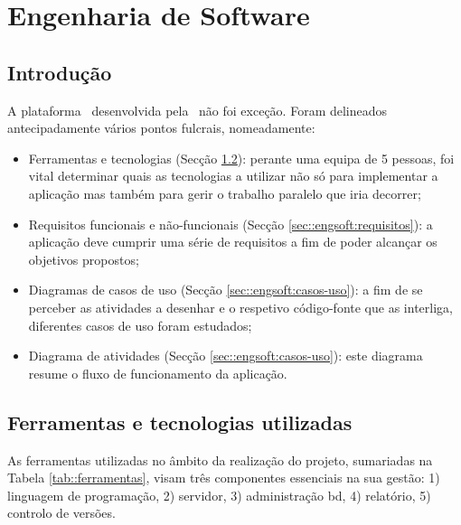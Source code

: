 \chapter{Engenharia de Software}
\label{ch::engsoft}


\section{Introdução}
\label{sec::engsoft:intro}

A plataforma \appname~desenvolvida pela \groupname~não foi exceção. Foram delineados antecipadamente vários pontos fulcrais, nomeadamente:


\begin{itemize}
    \item Ferramentas e tecnologias (Secção \ref{sec::engsoft:tecnologia}): perante uma equipa de 5 pessoas, foi vital determinar quais as tecnologias a utilizar não só para implementar a aplicação mas também para gerir o trabalho paralelo que iria decorrer;
    \item Requisitos funcionais e não-funcionais (Secção \ref{sec::engsoft:requisitos}): a aplicação deve cumprir uma série de requisitos a fim de poder alcançar os objetivos propostos;
    \item Diagramas de casos de uso (Secção \ref{sec::engsoft:casos-uso}): a fim de se perceber as atividades a desenhar e o respetivo código-fonte que as interliga, diferentes casos de uso foram estudados;
    \item Diagrama de atividades (Secção \ref{sec::engsoft:casos-uso}): este diagrama resume o fluxo de funcionamento da aplicação.
\end{itemize}


\section{Ferramentas e tecnologias utilizadas}
\label{sec::engsoft:tecnologia}

As ferramentas utilizadas no âmbito da realização do projeto, sumariadas na Tabela \ref{tab::ferramentas}, visam três componentes essenciais na sua gestão: 1) linguagem de programação, 2) servidor, 3) administração bd, 4) relatório, 5) controlo de versões.



